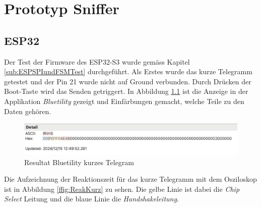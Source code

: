 



\chapter{Prototyp Sniffer} %
\label{Prototyp Sniffer} %


\section{ESP32}
\label{sec:ResultatESP32}

Der Test der Firmware des ESP32-S3 wurde gemäss Kapitel \ref{sub:ESPSPIundFSMTest} durchgeführt. Als Erstes wurde das kurze Telegramm getestet und der Pin 21 wurde nicht auf Ground verbunden. Durch Drücken der Boot-Taste wird das Senden getriggert. In Abbildung \ref{fig:ResultatBLEKurz} ist die Anzeige in der Applikation \textit{Bluetility} gezeigt und Einfärbungen gemacht, welche Teile zu den Daten gehören.

\begin{figure}[H]
    \centering
    \includegraphics[width=0.9\linewidth]{Figures/Chap4/ESP32/Resultat_BLE_kurz.png}
    \caption{Resultat Bluetility kurzes Telegram}
    \label{fig:ResultatBLEKurz}
\end{figure}

Die Aufzeichnung der Reaktionszeit für das kurze Telegramm mit dem Osziloskop ist in Abbildung \ref{ffig:ReakKurz} zu sehen. Die gelbe Linie ist dabei die \textit{Chip Select} Leitung und die blaue Linie die \textit{Handshakeleitung}. 

